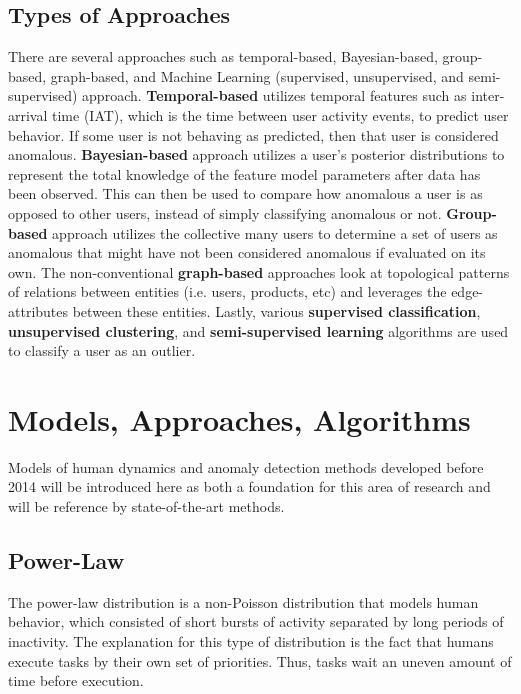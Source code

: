\documentclass[11pt, oneside]{article}   	%
\begin{document}
\subsection{Types of Approaches}
There are several approaches such as temporal-based, Bayesian-based, group-based, graph-based, and Machine Learning (supervised, unsupervised, and semi-supervised) approach. \textbf{Temporal-based} utilizes temporal features such as inter-arrival time (IAT), which is the time between user activity events, to predict user behavior. If some user is not behaving as predicted, then that user is considered anomalous.  \textbf{Bayesian-based} approach utilizes a user's posterior distributions to represent the total knowledge of the feature model parameters after data has been observed. This can then be used to compare how anomalous a user is as opposed to other users, instead of simply classifying anomalous or not. \textbf{Group-based} approach utilizes the collective many users to determine a set of users as anomalous that might have not been considered anomalous if evaluated on its own. The non-conventional \textbf{graph-based} approaches look at topological patterns of relations between entities (i.e. users, products, etc) and leverages the edge-attributes between these entities. Lastly, various \textbf{supervised classification}, \textbf{unsupervised clustering}, and \textbf{semi-supervised learning} algorithms are used to classify a user as an outlier.

\section{Models, Approaches, Algorithms} \label{found_models}

\quad Models of human dynamics and anomaly detection methods  developed before 2014 will be introduced here as both a foundation for this area of research and will be reference by state-of-the-art methods. 

\subsection*{Power-Law }

\quad The power-law distribution \cite{powerlaw} is a non-Poisson distribution that models human behavior, which consisted of short bursts of activity separated by long periods of inactivity.
The explanation for this type of distribution is the fact that humans execute tasks by their own set of priorities.
Thus, tasks wait an uneven amount of time before execution. 
\end{document}

